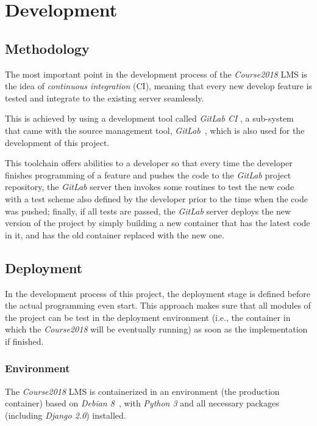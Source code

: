 

\chapter{Development}
\label{chap:DEV}

\section{Methodology}
The most important point in the development process of the \emph{Course2018}
LMS is the idea of \emph{continuous integration} (CI), meaning that every new
develop feature is tested and integrate to the existing server seamlessly.

\medskip
This is achieved by using a development tool called \emph{GitLab CI}
\cite{gitlabCI}, a sub-system that came with the source management tool,
\emph{GitLab}~\cite{gitlab}, which is also used for the development of this
project. 

\medskip

This toolchain offers abilities to a developer so that every time
the developer finishes programming of a feature and pushes the code to the
\emph{GitLab} project repository, the \emph{GitLab} server then invokes some
routines to test the new code with a test scheme also defined by the developer
prior to the time when the code was pushed; finally, if all tests are passed, 
the \emph{GitLab} server deploys the new version of the project by simply
building a new container that has the latest code in it, and has the old
container replaced with the new one.

\section{Deployment}
In the development process of this project, the deployment stage is defined
before the actual programming even start. This approach makes sure that all
modules of the project can be test in the
deployment environment (i.e., the container in which the \emph{Course2018}
will be eventually running) as soon as the implementation if finished.

\subsection{Environment}
The \emph{Course2018} LMS is containerized in an environment
(the production container) based on
\emph{Debian 8}~\cite{debian}, with \emph{Python 3} and all necessary packages
(including \emph{Django 2.0}) installed.

